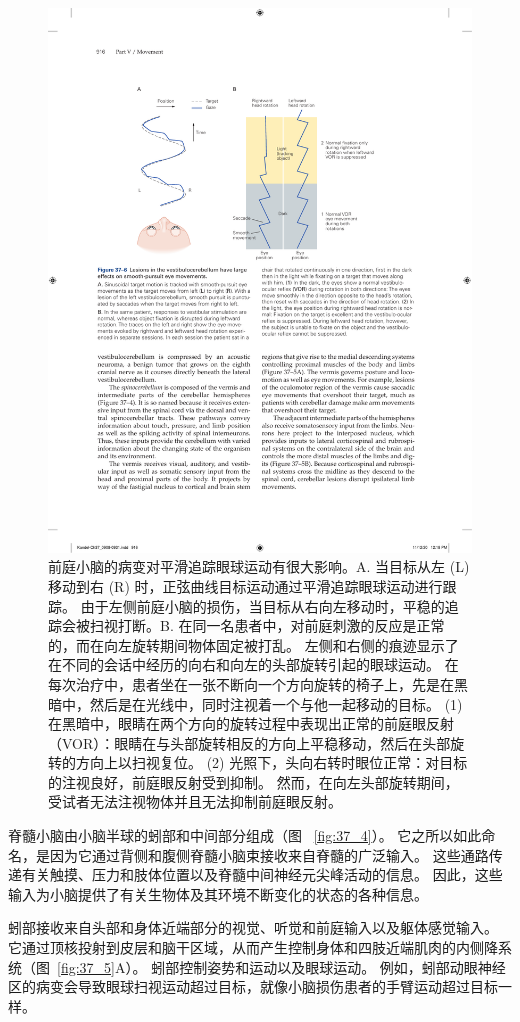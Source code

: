 \begin{figure}[htbp]
	\centering
	\includegraphics[width=0.8\linewidth]{chap37/fig_37_6}
	\caption{前庭小脑的病变对平滑追踪眼球运动有很大影响。A. 当目标从左 (L) 移动到右 (R) 时，正弦曲线目标运动通过平滑追踪眼球运动进行跟踪。 由于左侧前庭小脑的损伤，当目标从右向左移动时，平稳的追踪会被扫视打断。B. 在同一名患者中，对前庭刺激的反应是正常的，而在向左旋转期间物体固定被打乱。 左侧和右侧的痕迹显示了在不同的会话中经历的向右和向左的头部旋转引起的眼球运动。 在每次治疗中，患者坐在一张不断向一个方向旋转的椅子上，先是在黑暗中，然后是在光线中，同时注视着一个与他一起移动的目标。 (1) 在黑暗中，眼睛在两个方向的旋转过程中表现出正常的前庭眼反射（VOR）：眼睛在与头部旋转相反的方向上平稳移动，然后在头部旋转的方向上以扫视复位。 (2) 光照下，头向右转时眼位正常：对目标的注视良好，前庭眼反射受到抑制。 然而，在向左头部旋转期间，受试者无法注视物体并且无法抑制前庭眼反射。}
	\label{fig:37_6}
\end{figure}


脊髓小脑由小脑半球的蚓部和中间部分组成（图 ~\ref{fig:37_4}）。
它之所以如此命名，是因为它通过背侧和腹侧脊髓小脑束接收来自脊髓的广泛输入。
这些通路传递有关触摸、压力和肢体位置以及脊髓中间神经元尖峰活动的信息。
因此，这些输入为小脑提供了有关生物体及其环境不断变化的状态的各种信息。


蚓部接收来自头部和身体近端部分的视觉、听觉和前庭输入以及躯体感觉输入。
它通过顶核投射到皮层和脑干区域，从而产生控制身体和四肢近端肌肉的内侧降系统（图~\ref{fig:37_5}A）。
蚓部控制姿势和运动以及眼球运动。
例如，蚓部动眼神经区的病变会导致眼球扫视运动超过目标，就像小脑损伤患者的手臂运动超过目标一样。


